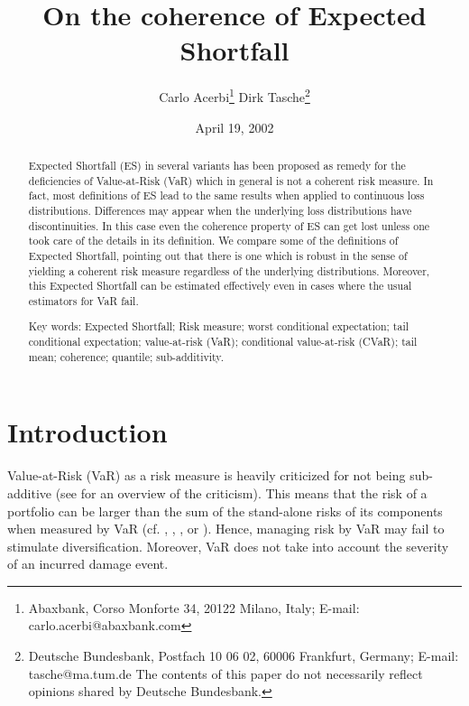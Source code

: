 \documentclass[11pt,a4paper,leqno]{article}
\title{On the coherence of Expected Shortfall}
\author{
Carlo Acerbi\thanks{Abaxbank, Corso Monforte 34, 20122 Milano, Italy;
E-mail: carlo.acerbi@abaxbank.com}
\quad
Dirk Tasche\thanks{Deutsche Bundesbank, Postfach 10 06 02, 60006 Frankfurt,
Germany; E-mail: tasche@ma.tum.de\newline
The contents of this paper do not necessarily reflect opinions shared by Deutsche Bundesbank.}
}
\date{April 19, 2002}
\begin{document}
\maketitle
\begin{abstract}
Expected Shortfall (ES) in several variants has been proposed as remedy for
the deficiencies of Value-at-Risk (VaR) which in general is not a coherent risk measure.
In fact, most definitions of ES lead to the same results when applied to
continuous loss distributions. Differences may appear when the underlying
loss distributions have discontinuities. In this case even the coherence
property of ES can get lost unless one took care of the details in its
definition. We compare some of the definitions of Expected Shortfall,
pointing out that there is one which is robust in the sense 
of yielding a coherent risk measure regardless of the underlying
distributions. Moreover, this Expected Shortfall can be estimated
effectively even in cases where the usual estimators for VaR fail.


{\sc Key words:} Expected Shortfall; Risk measure; worst conditional expectation; tail conditional expectation;
value-at-risk (VaR); conditional value-at-risk (CVaR); tail mean; coherence; quantile;
sub-additivity.
\end{abstract}

\section{Introduction}

Value-at-Risk (VaR) as a risk measure is heavily criticized for not being
sub-additive (see \cite{Em00} for an overview of the
criticism). 
This means that the risk of a portfolio can be larger than
the sum of the stand-alone risks of its components when measured by VaR
(cf. \cite{ADEH97}, \cite{ADEH99}, \cite{RK99}, or \cite{ANS}). Hence, managing risk
by VaR may fail to stimulate diversification. Moreover, VaR does not take into
account the severity of an incurred damage event.
\end{document}
